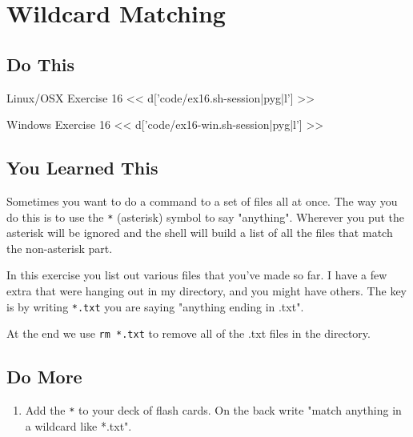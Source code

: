 \chapter{Wildcard Matching}

\section{Do This}

\begin{code}{Linux/OSX Exercise 16}
<< d['code/ex16.sh-session|pyg|l'] >>
\end{code}

\begin{code}{Windows Exercise 16}
<< d['code/ex16-win.sh-session|pyg|l'] >>
\end{code}

\section{You Learned This}

Sometimes you want to do a command to a set of files all at once.  The way you do
this is to use the \verb|*| (asterisk) symbol to say "anything".  Wherever you
put the asterisk will be ignored and the shell will build a list of all the files
that match the non-asterisk part.

In this exercise you list out various files that you've made so far.  I have a
few extra that were hanging out in my directory, and you might have others.  The
key is by writing \verb|*.txt| you are saying "anything ending in .txt".

At the end we use \verb|rm *.txt| to remove all of the .txt files in the
 directory.

\section{Do More}

\begin{enumerate}
\item Add the \verb|*| to your deck of flash cards.  On the back write "match anything in a wildcard like *.txt".
\end{enumerate}


